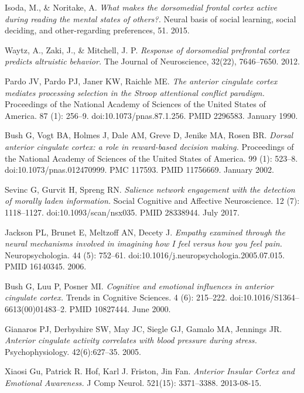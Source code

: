 \documentclass[twocolumn]{article}
\begin{document}
\begin{thebibliography}{9}
  Isoda, M., \& Noritake, A.
  \textit{What makes the dorsomedial frontal cortex active
    during reading the mental states of others?.}
  Neural basis of social learning, social deciding, and other-regarding preferences,
  51. 2015.

  Waytz, A., Zaki, J., \& Mitchell, J. P.
  \textit{Response of dorsomedial prefrontal cortex predicts altruistic behavior.}
  The Journal of Neuroscience, 32(22), 7646–7650. 2012.

  Pardo JV, Pardo PJ, Janer KW, Raichle ME.
  \textit{The anterior cingulate cortex mediates processing selection in the Stroop
    attentional conflict paradigm.}
  Proceedings of the National Academy of Sciences of the United States of
  America. 87 (1): 256–9. doi:10.1073/pnas.87.1.256. PMID 2296583. January 1990.

  Bush G, Vogt BA, Holmes J, Dale AM, Greve D, Jenike MA, Rosen BR.
  \textit{Dorsal anterior cingulate cortex: a role in reward-based decision making.}
  Proceedings of the National Academy of Sciences of the United States of
  America. 99 (1): 523–8. doi:10.1073/pnas.012470999. PMC 117593. PMID
  11756669. January 2002.

  Sevinc G, Gurvit H, Spreng RN.
  \textit{Salience network engagement with the detection of morally laden
    information.}
  Social Cognitive and Affective Neuroscience. 12 (7):
  1118–1127. doi:10.1093/scan/nsx035. PMID 28338944. July 2017.

  Jackson PL, Brunet E, Meltzoff AN, Decety J.
  \textit{Empathy examined through the neural mechanisms involved in imagining how I
    feel versus how you feel pain.}
  Neuropsychologia. 44 (5): 752–61. doi:10.1016/j.neuropsychologia.2005.07.015. PMID
  16140345. 2006.

  Bush G, Luu P, Posner MI.
  \textit{Cognitive and emotional influences in anterior cingulate cortex.}
  Trends in Cognitive Sciences. 4 (6):
  215–222. doi:10.1016/S1364–6613(00)01483–2. PMID 10827444. June 2000.

  Gianaros PJ, Derbyshire SW, May JC, Siegle GJ, Gamalo MA, Jennings JR.
  \textit{Anterior cingulate activity correlates with blood pressure during
    stress.}
  Psychophysiology. 42(6):627–35. 2005.

  Xiaosi Gu, Patrick R. Hof, Karl J. Friston, Jin Fan.
  \textit{Anterior Insular Cortex and Emotional Awareness.}
  J Comp Neurol. 521(15): 3371–3388. 2013-08-15.


\end{thebibliography}
\end{document}

